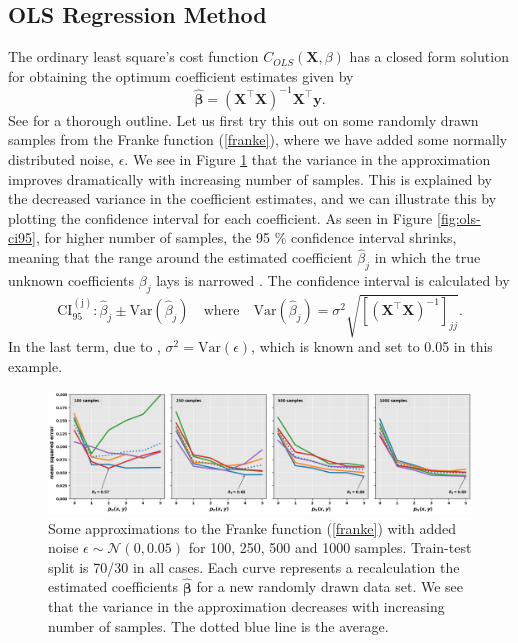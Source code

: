 \documentclass[]{article}
\begin{document}
\subsection{OLS Regression Method}
The ordinary least square's cost function $C_{OLS}(\mathbf{X},\mathbb{\beta})$ has a closed form solution for obtaining the optimum coefficient estimates given by
\begin{equation}
\label{osl-reg}
	\mathbf{\hat{\beta}} = (\mathbf{X}^\intercal \mathbf{X})^{-1} \mathbf{X}^\intercal \mathbf{y}.
\end{equation}
See \cite{van2015lecture} for a thorough outline. Let us first try this out on some randomly drawn samples from the Franke function (\ref{franke}), where we have added some normally distributed noise, $\epsilon$. We see in Figure \ref{fig:ols-simple-varying-n} that the variance in the approximation improves dramatically with increasing number of samples. This is explained by the decreased variance in the coefficient estimates, and we can illustrate this by plotting the confidence interval for each coefficient. As seen in Figure \ref{fig:ols-ci95}, for higher number of samples, the 95 \% confidence interval shrinks, meaning that the range around the estimated coefficient $\hat\beta_j$ in which the true unknown coefficients $\beta_j$ lays is narrowed \cite{james2013introduction}. The confidence interval is calculated by
\begin{equation}
\label{ci}
	\mathrm{CI_{95}^{(j)}}: \hat{\beta}_j \pm \mathrm{Var}(\hat{\beta}_j) \quad \text{where} \quad \mathrm{Var}(\hat{\beta}_j) = \sigma^2\sqrt{[(\mathbf{X}^\intercal \mathbf{X})^{-1}]_{jj}}.
\end{equation}
In the last term, due to \cite{fys-stk4155-notes}, $\sigma^2 = \mathrm{Var}(\epsilon)$, which is known and set to 0.05 in this example.

\begin{figure}[!htb]
	\centering
	\includegraphics[width=1\linewidth]{./results/ols-simple-varying-n.png}
	\caption{Some approximations to the Franke function (\ref{franke}) with added noise $\epsilon  \sim \mathcal{N}(0, 0.05)$ for 100, 250, 500 and 1000 samples. Train-test split is 70/30 in all cases. Each curve represents a recalculation the estimated coefficients $\mathbf{\hat{\beta}}$ for a new randomly drawn data set. We see that the variance in the approximation decreases with increasing number of samples. The dotted blue line is the average.}
	\label{fig:ols-simple-varying-n}
\end{figure}
\end{document}
